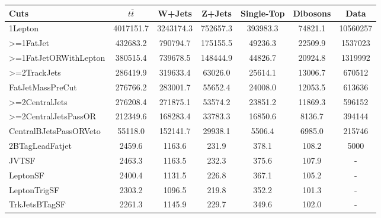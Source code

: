 \begin{table}[!htbp]
\begin{center}
\begin{adjustbox}{max width=\textwidth}
\begin{tabular}{| l | c | c | c | c | c | c |}
Cuts                      &   $t\bar{t}$    &     W+Jets      &     Z+Jets      &   Single-Top    &    Dibosons     &      Data       \\
\hline
1Lepton                   &    4017151.7    &    3243174.3    &    752657.3     &    393983.3     &     74821.1     &   10560257      \\
>=1FatJet                 &    432683.2     &    790794.7     &    175155.5     &     49236.3     &     22509.9     &    1537023      \\
>=1FatJetORWithLepton     &    380515.4     &    739678.5     &    148444.9     &     44826.7     &     20924.8     &    1319992      \\
>=2TrackJets              &    286419.9     &    319633.4     &     63026.0     &     25614.1     &     13006.7     &    670512       \\
FatJetMassPreCut          &    276766.2     &    283001.7     &     55652.4     &     24008.0     &     12053.5     &    613636       \\
>=2CentralJets            &    276208.4     &    271875.1     &     53574.2     &     23851.2     &     11869.3     &    596152       \\
>=2CentralJetsPassOR      &    212349.6     &    168283.4     &     33783.3     &     16850.6     &     8136.7      &    394144       \\
CentralBJetsPassORVeto    &     55118.0     &    152141.7     &     29938.1     &     5506.4      &     6985.0      &    215746       \\
2BTagLeadFatjet           &     2459.6      &     1163.6      &      231.9      &      378.1      &      108.2      &    5000         \\
JVTSF                     &     2463.3      &     1163.5      &      232.3      &      375.6      &      107.9      &      -          \\
LeptonSF                  &     2400.4      &     1131.5      &      226.8      &      367.1      &      105.2      &      -          \\
LeptonTrigSF              &     2303.2      &     1096.5      &      219.8      &      352.2      &      101.3      &      -          \\
TrkJetsBTagSF             &     2261.3      &     1145.9      &      229.7      &      349.6      &      102.0      &      -          \\

\end{tabular}
\end{adjustbox}
\end{center}
\end{table}
